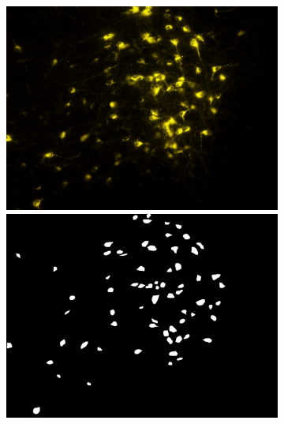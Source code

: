 \begin{figure}%
\centering
\begin{subfigure}{1.1\textwidth}
\includegraphics[width=0.5\linewidth]{figures/120_dataset/i_clumping_yellow.png}
\includegraphics[width=0.5\linewidth]{figures/120_dataset/m_clumping_yellow.png}
\subcaption{}
\label{fig:artifacts:clumping}
\end{subfigure}


\end{figure}
